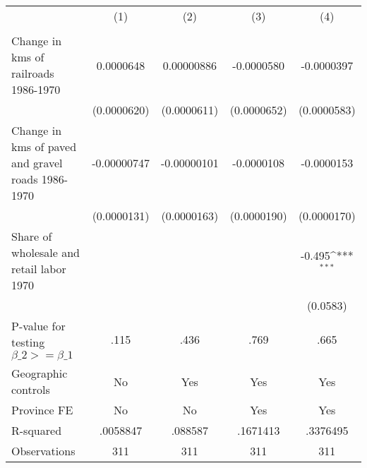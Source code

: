 {
\def\sym#1{\ifmmode^{#1}\else\(^{#1}\)\fi}
\begin{tabular}{l*{4}{c}}
\hline\hline
                &\multicolumn{1}{c}{(1)}&\multicolumn{1}{c}{(2)}&\multicolumn{1}{c}{(3)}&\multicolumn{1}{c}{(4)}\\
                &\multicolumn{1}{c}{}&\multicolumn{1}{c}{}&\multicolumn{1}{c}{}&\multicolumn{1}{c}{}\\
\hline
Change in kms of railroads 1986-1970&0.0000648         &0.00000886         &-0.0000580         &-0.0000397         \\
                &(0.0000620)         &(0.0000611)         &(0.0000652)         &(0.0000583)         \\
[1em]
Change in kms of paved and gravel roads 1986-1970&-0.00000747         &-0.00000101         &-0.0000108         &-0.0000153         \\
                &(0.0000131)         &(0.0000163)         &(0.0000190)         &(0.0000170)         \\
[1em]
Share of wholesale and retail labor 1970&                  &                  &                  &   -0.495\sym{***}\\
                &                  &                  &                  & (0.0583)         \\
\hline
P-value for testing $\beta\_{2} >= \beta\_{1}$&     .115         &     .436         &     .769         &     .665         \\
Geographic controls&       No         &      Yes         &      Yes         &      Yes         \\
Province FE     &       No         &       No         &      Yes         &      Yes         \\
R-squared       & .0058847         &  .088587         & .1671413         & .3376495         \\
Observations    &      311         &      311         &      311         &      311         \\
\hline\hline
\end{tabular}
}
